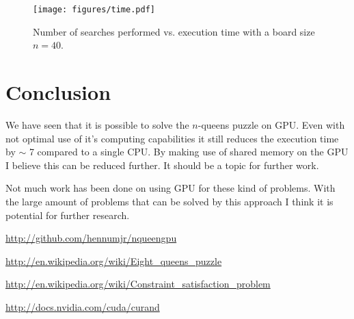 \documentclass{article}
\begin{document}
\begin{figure}[H]
     \begin{center}
         \texttt{[image: figures/time.pdf]}
     \end{center}
     \caption{Number of searches performed vs. execution time with a board size $n = 40$.}
     \label{fig:time}
 \end{figure}

\section{Conclusion}

We have seen that it is possible to solve the $n$-queens puzzle on GPU. Even with not optimal use 
of it's computing capabilities it still reduces the execution time by $\sim$ 7 compared to a single
CPU. By making use of shared memory on the GPU I believe this can
be reduced further. It should be a topic for further work. 

Not much work has been done on using GPU for these kind of problems. With the large amount 
of problems that can be solved by this approach I think it is potential for further research.

\begin{thebibliography}{9}

    \url{http://github.com/hennumjr/nqueengpu}

	\url{http://en.wikipedia.org/wiki/Eight_queens_puzzle}

    \url{http://en.wikipedia.org/wiki/Constraint_satisfaction_problem}

    \url{http://docs.nvidia.com/cuda/curand}

\end{thebibliography} 

\appendix
\end{document}
